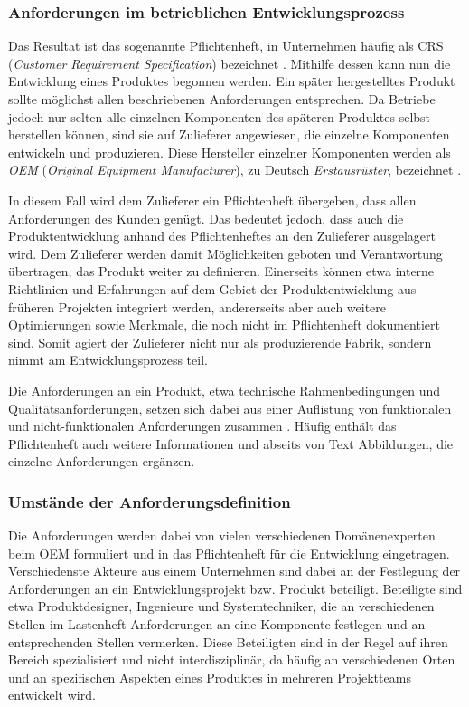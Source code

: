 \documentclass[12pt]{report}
\begin{document}
\subsubsection{Anforderungen im betrieblichen Entwicklungsprozess}
Das Resultat ist das sogenannte Pflichtenheft, in Unternehmen häufig als CRS (\textit{Customer Requirement Specification}) bezeichnet \cite{dge19}. Mithilfe dessen kann nun die Entwicklung eines Produktes begonnen werden. Ein später hergestelltes Produkt sollte möglichst allen beschriebenen Anforderungen entsprechen. Da Betriebe jedoch nur selten alle einzelnen Komponenten des späteren Produktes selbst herstellen können, sind sie auf Zulieferer angewiesen, die einzelne Komponenten entwickeln und produzieren. Diese Hersteller einzelner Komponenten werden als \textit{OEM} (\textit{Original Equipment Manufacturer}), zu Deutsch \textit{Erstausrüster}, bezeichnet \cite{ir09}.  

In diesem Fall wird dem Zulieferer ein Pflichtenheft übergeben, dass allen Anforderungen des Kunden genügt. Das bedeutet jedoch, dass auch die Produktentwicklung anhand des Pflichtenheftes an den Zulieferer ausgelagert wird. Dem Zulieferer werden damit Möglichkeiten geboten und Verantwortung übertragen, das Produkt weiter zu definieren. Einerseits können etwa interne Richtlinien und Erfahrungen auf dem Gebiet der Produktentwicklung aus früheren Projekten integriert werden, andererseits aber auch weitere Optimierungen sowie Merkmale, die noch nicht im Pflichtenheft dokumentiert sind. Somit agiert der Zulieferer nicht nur als produzierende Fabrik, sondern nimmt am Entwicklungsprozess teil.

Die Anforderungen an ein Produkt, etwa technische Rahmenbedingungen und Qualitätsanforderungen, setzen sich dabei aus einer Auflistung von funktionalen und nicht-funktionalen Anforderungen zusammen \cite{bal10}. Häufig enthält das Pflichtenheft auch weitere Informationen und abseits von Text Abbildungen, die einzelne Anforderungen ergänzen. 

\subsubsection{Umstände der Anforderungsdefinition}
Die Anforderungen werden dabei von vielen verschiedenen Domänenexperten beim OEM formuliert und in das Pflichtenheft für die Entwicklung eingetragen. Verschiedenste Akteure aus einem Unternehmen sind dabei an der Festlegung der Anforderungen an ein Entwicklungsprojekt bzw. Produkt beteiligt. Beteiligte sind etwa Produktdesigner, Ingenieure und Systemtechniker, die an verschiedenen Stellen im Lastenheft Anforderungen an eine Komponente festlegen und an entsprechenden Stellen vermerken. Diese Beteiligten sind in der Regel auf ihren Bereich spezialisiert und nicht interdisziplinär, da häufig an verschiedenen Orten und an spezifischen Aspekten eines Produktes in mehreren Projektteams entwickelt wird. 
\end{document}
